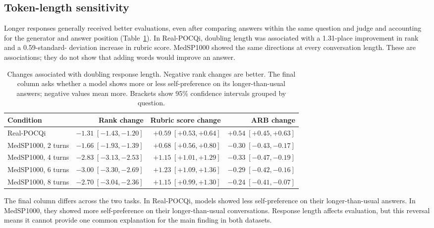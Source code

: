 \documentclass[11pt]{article}
\begin{document}
\subsection{Token-length sensitivity}

Longer responses generally received better evaluations, even after comparing
answers within the same question and judge and accounting for the generator
and answer position (Table~\ref{tab:length}). In Real-POCQi, doubling length
was associated with a 1.31-place improvement in rank and a 0.59-standard-
deviation increase in rubric score. MedSP1000 showed the same directions at
every conversation length. These are associations; they do not show that
adding words would improve an answer.

\begin{table}[htbp]
\centering
\scriptsize
\caption{Changes associated with doubling response length. Negative rank
changes are better. The final column asks whether a model shows more or less
self-preference on its longer-than-usual answers; negative values mean more.
Brackets show 95\% confidence intervals grouped by question.}
\label{tab:length}
\begin{tabular}{lrrr}
\toprule
Condition & Rank change & Rubric score change & ARB change \\
\midrule
Real-POCQi & $-1.31\;[-1.43,-1.20]$ & $+0.59\;[+0.53,+0.64]$ & $\boldsymbol{+0.54\;[+0.45,+0.63]}$ \\
MedSP1000, 2 turns & $-1.66\;[-1.93,-1.39]$ & $+0.68\;[+0.56,+0.80]$ & $-0.30\;[-0.43,-0.17]$ \\
MedSP1000, 4 turns & $-2.83\;[-3.13,-2.53]$ & $+1.15\;[+1.01,+1.29]$ & $-0.33\;[-0.47,-0.19]$ \\
MedSP1000, 6 turns & $\boldsymbol{-3.00\;[-3.30,-2.69]}$ & $\boldsymbol{+1.23\;[+1.09,+1.36]}$ & $-0.29\;[-0.42,-0.16]$ \\
MedSP1000, 8 turns & $-2.70\;[-3.04,-2.36]$ & $+1.15\;[+0.99,+1.30]$ & $-0.24\;[-0.41,-0.07]$ \\
\bottomrule
\end{tabular}
\end{table}
\FloatBarrier

The final column differs across the two tasks. In Real-POCQi, models showed
less self-preference on their longer-than-usual answers. In MedSP1000, they
showed more self-preference on their longer-than-usual conversations. Response
length affects evaluation, but this reversal means it cannot provide one
common explanation for the main finding in both datasets.
\end{document}
